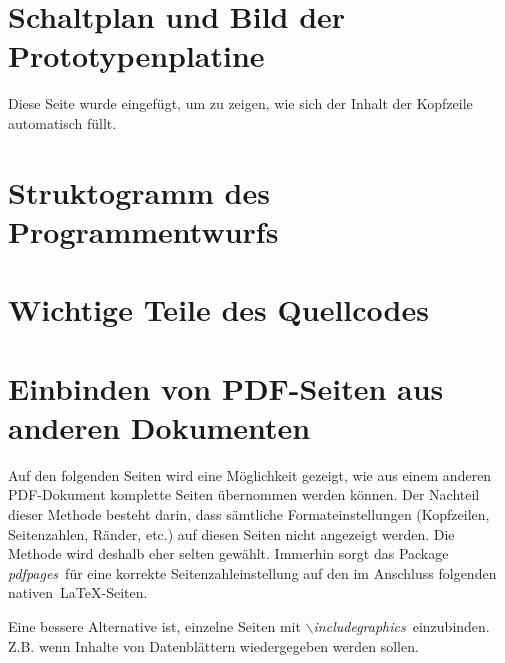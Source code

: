 \section{Schaltplan und Bild der Prototypenplatine}

\clearpage

Diese Seite wurde eingefügt, um zu zeigen, wie sich der Inhalt der Kopfzeile automatisch füllt.

\setcounter{chapter}{3}
\setcounter{section}{0}
\setcounter{table}{0}
\setcounter{figure}{0}

\section{Struktogramm des Programmentwurfs}

\section{Wichtige Teile des Quellcodes}

\setcounter{chapter}{4}
\setcounter{section}{0}
\setcounter{table}{0}
\setcounter{figure}{0}

\section{Einbinden von PDF-Seiten aus anderen Dokumenten}

Auf den folgenden Seiten wird eine Möglichkeit gezeigt, wie aus einem anderen PDF-Dokument komplette Seiten übernommen werden können. Der Nachteil dieser Methode besteht darin, dass sämtliche Formateinstellungen (Kopfzeilen, Seitenzahlen, Ränder, etc.) auf diesen Seiten nicht angezeigt werden. Die Methode wird deshalb eher selten gewählt. Immerhin sorgt das Package \textit{\glqq pdfpages\grqq}~für eine korrekte Seitenzahleinstellung auf den im Anschluss folgenden \glqq nativen\grqq~\LaTeX-Seiten.

Eine bessere Alternative ist, einzelne Seiten mit \textit{\glqq$\backslash$includegraphics\grqq}~einzubinden. Z.B. wenn Inhalte von Datenblättern wiedergegeben werden sollen.


